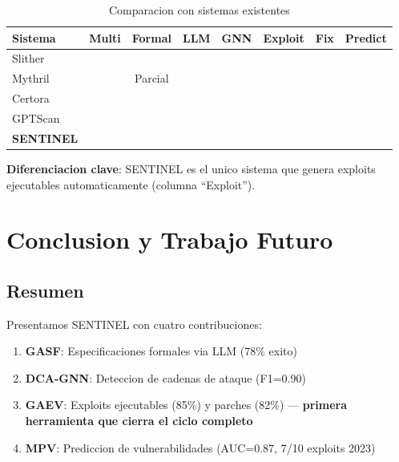 \documentclass[11pt]{article}
\newcommand{\cmark}{\ding{51}}
\newcommand{\xmark}{\ding{55}}
\theoremstyle{definition}
\theoremstyle{plain}
\theoremstyle{remark}
\begin{document}
\begin{table}[H]
\centering
\caption{Comparacion con sistemas existentes}
\label{tab:related}
\begin{tabular}{lccccccc}
\toprule
\textbf{Sistema} & \textbf{Multi} & \textbf{Formal} & \textbf{LLM} & \textbf{GNN} & \textbf{Exploit} & \textbf{Fix} & \textbf{Predict} \\
\midrule
Slither & \xmark & \xmark & \xmark & \xmark & \xmark & \xmark & \xmark \\
Mythril & \xmark & Parcial & \xmark & \xmark & \xmark & \xmark & \xmark \\
Certora & \xmark & \cmark & \xmark & \xmark & \xmark & \xmark & \xmark \\
GPTScan & \xmark & \xmark & \cmark & \xmark & \xmark & \xmark & \xmark \\
\textbf{SENTINEL} & \cmark & \cmark & \cmark & \cmark & \cmark & \cmark & \cmark \\
\bottomrule
\end{tabular}
\end{table}

\textbf{Diferenciacion clave}: SENTINEL es el unico sistema que genera exploits ejecutables automaticamente (columna ``Exploit'').

\section{Conclusion y Trabajo Futuro}
\label{sec:conclusion}

\subsection{Resumen}

Presentamos SENTINEL con cuatro contribuciones:

\begin{enumerate}[label=\textbf{C\arabic*:}]
    \item \textbf{GASF}: Especificaciones formales via LLM (78\% exito)
    \item \textbf{DCA-GNN}: Deteccion de cadenas de ataque (F1=0.90)
    \item \textbf{GAEV}: Exploits ejecutables (85\%) y parches (82\%) --- \textbf{primera herramienta que cierra el ciclo completo}
    \item \textbf{MPV}: Prediccion de vulnerabilidades (AUC=0.87, 7/10 exploits 2023)
\end{enumerate}
\end{document}

